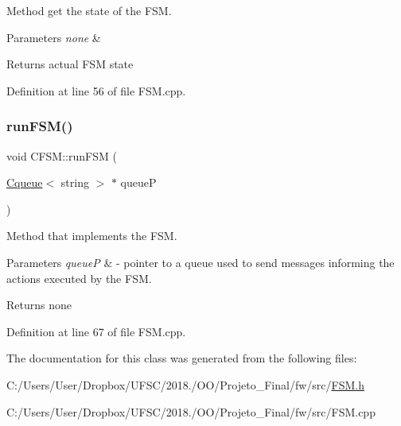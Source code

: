 Method get the state of the F\+SM. 


\begin{DoxyParams}{Parameters}
{\em none} & \\
\hline
\end{DoxyParams}
\begin{DoxyReturn}{Returns}
actual F\+SM state 
\end{DoxyReturn}


Definition at line 56 of file F\+S\+M.\+cpp.

\mbox{\label{class_c_f_s_m_a5e7a63354d1088160e3d790bebb099af}} 
\subsubsection{\texorpdfstring{run\+F\+S\+M()}{runFSM()}}
{\footnotesize\ttfamily void C\+F\+S\+M\+::run\+F\+SM (\begin{DoxyParamCaption}\item[{\mbox{\hyperlink{class_cqueue}{Cqueue}}$<$ string $>$ $\ast$}]{queueP }\end{DoxyParamCaption})}



Method that implements the F\+SM. 


\begin{DoxyParams}{Parameters}
{\em queueP} & -\/ pointer to a queue used to send messages informing the actions executed by the F\+SM. \\
\hline
\end{DoxyParams}
\begin{DoxyReturn}{Returns}
none 
\end{DoxyReturn}


Definition at line 67 of file F\+S\+M.\+cpp.



The documentation for this class was generated from the following files\+:\begin{DoxyCompactItemize}
\item 
C\+:/\+Users/\+User/\+Dropbox/\+U\+F\+S\+C/2018./\+O\+O/\+Projeto\+\_\+\+Final/fw/src/\mbox{\hyperlink{_f_s_m_8h}{F\+S\+M.\+h}}\item 
C\+:/\+Users/\+User/\+Dropbox/\+U\+F\+S\+C/2018./\+O\+O/\+Projeto\+\_\+\+Final/fw/src/F\+S\+M.\+cpp\end{DoxyCompactItemize}
